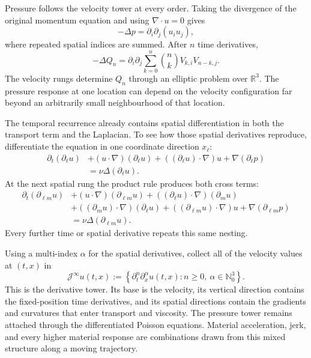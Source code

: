 
Pressure follows the velocity tower at every order.
Taking the divergence of the original momentum equation and using \(\nabla\cdot u=0\) gives
\[
  -\Delta p
  =
  \partial_i\partial_j(u_i u_j),
\]
where repeated spatial indices are summed.
After \(n\) time derivatives,
\[
  -\Delta Q_n
  =
  \partial_i\partial_j
  \sum_{k=0}^{n}
  \binom{n}{k}
  V_{k,i}V_{n-k,j}.
\]
The velocity rungs determine \(Q_n\) through an elliptic problem over \(\mathbb R^3\).
The pressure response at one location can depend on the velocity configuration far beyond an arbitrarily small neighbourhood of that location.

The temporal recurrence already contains spatial differentiation in both the transport term and the Laplacian.
To see how those spatial derivatives reproduce, differentiate the equation in one coordinate direction \(x_\ell\):
\[
  \begin{aligned}
  \partial_t(\partial_\ell u)
  &+
  (u\cdot\nabla)(\partial_\ell u)
  +
  ((\partial_\ell u)\cdot\nabla)u
  +
  \nabla(\partial_\ell p)\\
  &=
  \nu\Delta(\partial_\ell u).
  \end{aligned}
\]
At the next spatial rung the product rule produces both cross terms:
\[
  \begin{aligned}
  \partial_t(\partial_{\ell m}u)
  &+
  (u\cdot\nabla)(\partial_{\ell m}u)
  +
  ((\partial_\ell u)\cdot\nabla)(\partial_m u)\\
  &+
  ((\partial_m u)\cdot\nabla)(\partial_\ell u)
  +
  ((\partial_{\ell m}u)\cdot\nabla)u
  +
  \nabla(\partial_{\ell m}p)\\
  &=
  \nu\Delta(\partial_{\ell m}u).
  \end{aligned}
\]
Every further time or spatial derivative repeats this same nesting.

Using a multi-index \(\alpha\) for the spatial derivatives, collect all of the velocity values at \((t,x)\) in
\[
  \mathcal J^\infty u(t,x)
  :=
  \left\{
    \partial_t^n\partial_x^\alpha u(t,x):
    n\geq0,\ 
    \alpha\in\mathbb N_0^3
  \right\}.
\]
This is the derivative tower.
Its base is the velocity, its vertical direction contains the fixed-position time derivatives, and its spatial directions contain the gradients and curvatures that enter transport and viscosity.
The pressure tower remains attached through the differentiated Poisson equations.
Material acceleration, jerk, and every higher material response are combinations drawn from this mixed structure along a moving trajectory.

